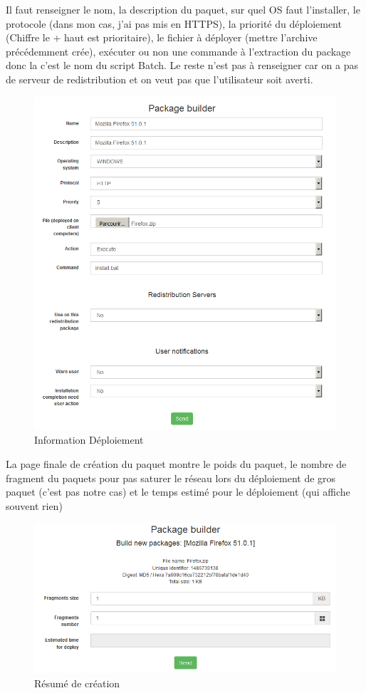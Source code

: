 \documentclass[11pt,a4paper,oneside]{article}
\begin{document}
Il faut renseigner le nom, la description du paquet, sur quel OS faut l'installer, le protocole (dans mon cas, j'ai pas mis en HTTPS), la priorité du déploiement (Chiffre le + haut est prioritaire), le fichier à déployer (mettre l'archive précédemment crée), exécuter ou non une commande à l'extraction du package donc la c'est le nom du script Batch. Le reste n'est pas à renseigner car on a pas de serveur de redistribution et on veut pas que l'utilisateur soit averti.
\begin{figure}[hbtp]
\centering
\includegraphics[scale=0.4]{Script/Deploiement2.PNG}
\caption{Information Déploiement}
\end{figure}
\newpage

La page finale de création du paquet montre le poids du paquet, le nombre de fragment du paquets pour pas saturer le réseau lors du déploiement de gros paquet (c'est pas notre cas) et le temps estimé pour le déploiement (qui affiche souvent rien)

\begin{figure}[hbtp]
\centering
\includegraphics[scale=0.6]{Script/Deploiement3.PNG}
\caption{Résumé de création}
\end{figure}
\end{document}
